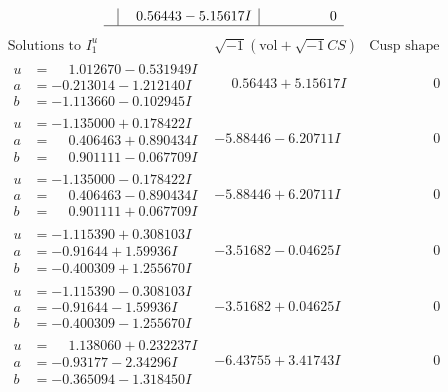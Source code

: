 \documentclass[1p]{elsarticle_modified}
\theoremstyle{definition}
\newcommand{\I}{\sqrt{-1}}
\begin{document}
$$\begin{array}{c|c|c}
 & \phantom{-}0.56443 - 5.15617 I & \phantom{-0.000000 } 0\\
 \hline 
 \end{array}$$\newpage$$\begin{array}{c|c|c}  
\text{Solutions to }I^u_{1}& \I (\text{vol} + \sqrt{-1}CS) & \text{Cusp shape}\\
 \hline 
\begin{aligned}
u &= \phantom{-}1.012670 - 0.531949 I \\
a &= -0.213014 - 1.212140 I \\
b &= -1.113660 - 0.102945 I\end{aligned}
 & \phantom{-}0.56443 + 5.15617 I & \phantom{-0.000000 } 0 \\ \hline\begin{aligned}
u &= -1.135000 + 0.178422 I \\
a &= \phantom{-}0.406463 + 0.890434 I \\
b &= \phantom{-}0.901111 - 0.067709 I\end{aligned}
 & -5.88446 - 6.20711 I & \phantom{-0.000000 } 0 \\ \hline\begin{aligned}
u &= -1.135000 - 0.178422 I \\
a &= \phantom{-}0.406463 - 0.890434 I \\
b &= \phantom{-}0.901111 + 0.067709 I\end{aligned}
 & -5.88446 + 6.20711 I & \phantom{-0.000000 } 0 \\ \hline\begin{aligned}
u &= -1.115390 + 0.308103 I \\
a &= -0.91644 + 1.59936 I \\
b &= -0.400309 + 1.255670 I\end{aligned}
 & -3.51682 - 0.04625 I & \phantom{-0.000000 } 0 \\ \hline\begin{aligned}
u &= -1.115390 - 0.308103 I \\
a &= -0.91644 - 1.59936 I \\
b &= -0.400309 - 1.255670 I\end{aligned}
 & -3.51682 + 0.04625 I & \phantom{-0.000000 } 0 \\ \hline\begin{aligned}
u &= \phantom{-}1.138060 + 0.232237 I \\
a &= -0.93177 - 2.34296 I \\
b &= -0.365094 - 1.318450 I\end{aligned}
 & -6.43755 + 3.41743 I & \phantom{-0.000000 } 0 \\ \hline\begin{aligned}

\end{aligned}
\end{array}$$
\end{document}
